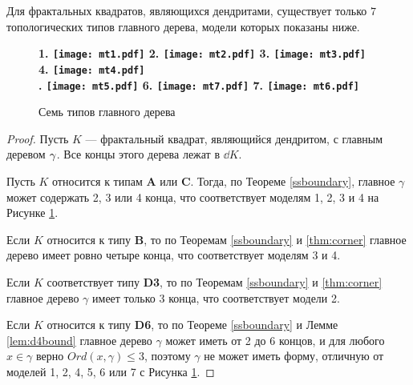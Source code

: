 \begin{theorem}\label{thm:7trees}
Для фрактальных квадратов, являющихся дендритами, существует только $7$ топологических типов главного дерева, модели которых показаны ниже.
\end{theorem}

\begin{figure}[H]
    \centering \Large {\bf
    1. \texttt{[image: mt1.pdf]}
    \hfill
    2. \texttt{[image: mt2.pdf]}
    \hfill
    3. \texttt{[image: mt3.pdf]}
    \hfill
    4. \texttt{[image: mt4.pdf]}\\
    . \texttt{[image: mt5.pdf]}
    \hfill
    6. \texttt{[image: mt7.pdf]}
    \hfill
    7. \texttt{[image: mt6.pdf]}}
    \caption{Семь типов главного дерева}
    \label{fig:7trees}
\end{figure}



\begin{proof}
Пусть $K$ --- фрактальный квадрат, являющийся дендритом, с главным деревом $\gamma$. 
Все концы этого дерева лежат в $\dd K$.

Пусть $K$ относится к типам {\bf A} или {\bf C}. 
Тогда, по Теореме \ref{ssboundary}, главное $\gamma$ может содержать 2, 3 или 4 конца, что соответствует моделям 1, 2, 3 и 4 на Рисунке \ref{fig:7trees}.


Если $K$ относится к типу {\bf B}, то по Теоремам \ref{ssboundary} и \ref{thm:corner} главное дерево имеет ровно четыре конца, что соответствует моделям 3 и 4.

Если $K$ соответствует типу {\bf D3}, то по Теоремам \ref{ssboundary} и \ref{thm:corner} главное дерево $\gamma$ имеет только 3 конца, что соответствует модели 2.

Если $K$ относится к типу {\bf D6}, то по Теореме \ref{ssboundary} и Лемме \ref{lem:d4bound} главное дерево $\gamma$ может иметь от 2 до 6 концов, и для любого  $x\in \gamma $ верно $ Ord(x,\gamma)\leq3$, поэтому $\gamma$ не может иметь форму, отличную от моделей 1, 2, 4, 5, 6 или 7 с Рисунка \ref{fig:7trees}.
\end{proof}


